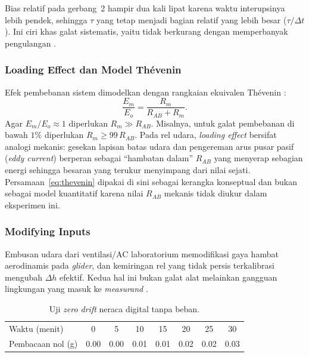 \documentclass[a4paper, 12pt]{article}
\begin{document}
            Bias relatif pada gerbang~2 hampir dua kali lipat karena waktu interupsinya lebih pendek, sehingga $\tau$ yang tetap menjadi bagian relatif yang lebih besar ($\tau/\Delta t$). Ini ciri khas galat sistematis, yaitu tidak berkurang dengan memperbanyak pengulangan \parencite{Taylor1997}.

            \subsubsection{Loading Effect dan Model Th\'evenin}
            Efek pembebanan sistem dimodelkan dengan rangkaian ekuivalen Th\'evenin \parencite{Bentley2005}:
            \begin{equation}
                \frac{E_m}{E_o}=\frac{R_m}{R_{AB}+R_m}.
                \label{eq:thevenin}
            \end{equation}
            Agar $E_m/E_o\approx1$ diperlukan $R_m\gg R_{AB}$. Misalnya, untuk galat pembebanan di bawah $1\%$ diperlukan $R_m\ge 99\,R_{AB}$. Pada rel udara, \textit{loading effect} bersifat analogi mekanis: gesekan lapisan batas udara dan pengereman arus pusar pasif (\textit{eddy current}) berperan sebagai ``hambatan dalam'' $R_{AB}$ yang menyerap sebagian energi sehingga besaran yang terukur menyimpang dari nilai sejati. Persamaan~\eqref{eq:thevenin} dipakai di sini sebagai kerangka konseptual dan bukan sebagai model kuantitatif karena nilai $R_{AB}$ mekanis tidak diukur dalam eksperimen ini.

            \subsubsection{Modifying Inputs}
            Embusan udara dari ventilasi/AC laboratorium memodifikasi gaya hambat aerodinamis pada \textit{glider}, dan kemiringan rel yang tidak persis terkalibrasi mengubah $\Delta h$ efektif. Kedua hal ini bukan galat alat melainkan gangguan lingkungan yang masuk ke \textit{measurand} \parencite{Bentley2005}.
\begin{table}[H]
\centering
\singlespacing
\caption{Uji \textit{zero drift} neraca digital tanpa beban.}
\label{tab:drift}
\small
\begin{tabular}{l *{7}{S[table-format=1.2]}}
\toprule
Waktu (menit) & {0} & {5} & {10} & {15} & {20} & {25} & {30}\\
Pembacaan nol (g) & 0.00 & 0.00 & 0.01 & 0.01 & 0.02 & 0.02 & 0.03\\
\bottomrule
\end{tabular}
\end{table}
\end{document}
